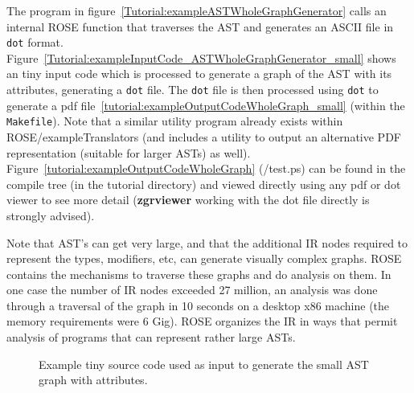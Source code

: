 The program in figure~\ref{Tutorial:exampleASTWholeGraphGenerator} calls 
an internal ROSE function that traverses the AST and generates 
an ASCII file in {\tt dot} format.
Figure~\ref{Tutorial:exampleInputCode_ASTWholeGraphGenerator_small} shows an tiny input
code which is processed to generate a graph of the AST with its attributes, generating a 
{\tt dot} file.   The {\tt dot} file is then processed
using {\tt dot} to generate a pdf file~\ref{tutorial:exampleOutputCodeWholeGraph_small}
(within the {\tt Makefile}).
Note that a similar utility program already exists within ROSE/exampleTranslators
(and includes a utility to output an alternative PDF representation 
(suitable for larger ASTs) as well).  Figure~\ref{tutorial:exampleOutputCodeWholeGraph}
(\TutorialExampleBuildDirectory/test.ps) can be found in the compile 
tree (in the tutorial directory) and viewed directly using 
any pdf or dot viewer to see more detail ({\bf zgrviewer} working with
the dot file directly is strongly advised).

   Note that AST's can get very large, and that the additional IR nodes required to
represent the types, modifiers, etc, can generate visually complex graphs. ROSE
contains the mechanisms to traverse these graphs and do analysis on them.  In
one case the number of IR nodes exceeded 27 million, an analysis was done through
a traversal of the graph in 10 seconds on a desktop x86 machine (the memory requirements
were 6 Gig).  ROSE organizes the IR in ways that permit analysis of programs that can 
represent rather large ASTs.



\begin{figure}[!h]
{\indent
{\mySmallFontSize

\begin{latexonly}
   
\end{latexonly}

\begin{htmlonly}
   
\end{htmlonly}

}
}
\caption{Example tiny source code used as input to generate the small AST graph with attributes.}
\label{Tutorial:exampleInputCode_ASTGraphGenerator_small}
\end{figure}

